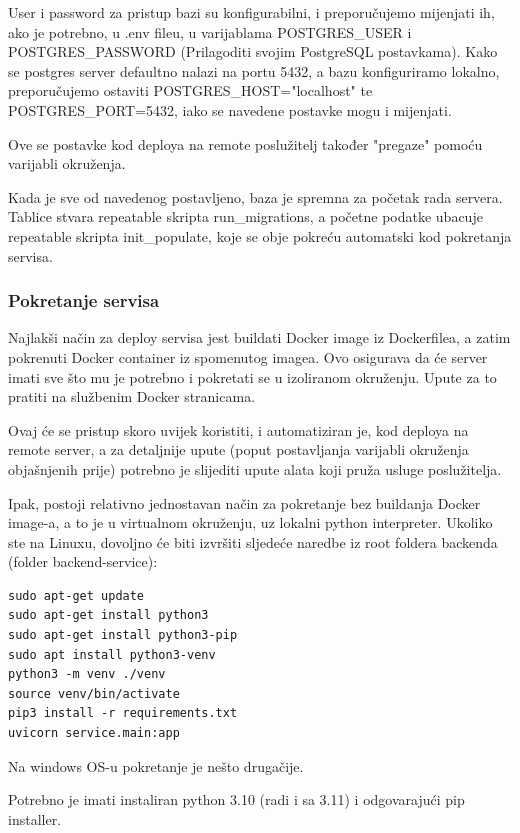 		User i password za pristup bazi su konfigurabilni, i preporučujemo mijenjati ih, ako je potrebno, u .env fileu, u varijablama POSTGRES\_USER i POSTGRES\_PASSWORD (Prilagoditi svojim PostgreSQL postavkama). Kako se postgres server defaultno nalazi na portu 5432, a bazu konfiguriramo lokalno, preporučujemo ostaviti POSTGRES\_HOST="localhost" te POSTGRES\_PORT=5432, iako se navedene postavke mogu i mijenjati.
		
		Ove se postavke kod deploya na remote poslužitelj također "pregaze" pomoću varijabli okruženja.
		
		Kada je sve od navedenog postavljeno, baza je spremna za početak rada servera. Tablice stvara repeatable skripta run\_migrations, a početne podatke ubacuje repeatable skripta init\_populate, koje se obje pokreću automatski kod pokretanja servisa.
		
		\subsubsection{Pokretanje servisa}
		
		Najlakši način za deploy servisa jest buildati Docker image iz Dockerfilea, a zatim pokrenuti Docker container iz spomenutog imagea. Ovo osigurava da će server imati sve što mu je potrebno i pokretati se u izoliranom okruženju. Upute za to pratiti na službenim Docker stranicama.
		
		Ovaj će se pristup skoro uvijek koristiti, i automatiziran je, kod deploya na remote server, a za detaljnije upute (poput postavljanja varijabli okruženja objašnjenih prije) potrebno je slijediti upute alata koji pruža usluge poslužitelja.
		
		Ipak, postoji relativno jednostavan način za pokretanje bez buildanja Docker image-a, a to je u virtualnom okruženju, uz lokalni python interpreter. Ukoliko ste na Linuxu, dovoljno će biti izvršiti sljedeće naredbe iz root foldera backenda (folder backend-service):
		
		\begin{lstlisting}
sudo apt-get update
sudo apt-get install python3
sudo apt-get install python3-pip
sudo apt install python3-venv
python3 -m venv ./venv
source venv/bin/activate
pip3 install -r requirements.txt
uvicorn service.main:app \end{lstlisting}

		Na windows OS-u pokretanje je nešto drugačije.
		
		Potrebno je imati instaliran python 3.10 (radi i sa 3.11) i odgovarajući pip installer.
		
